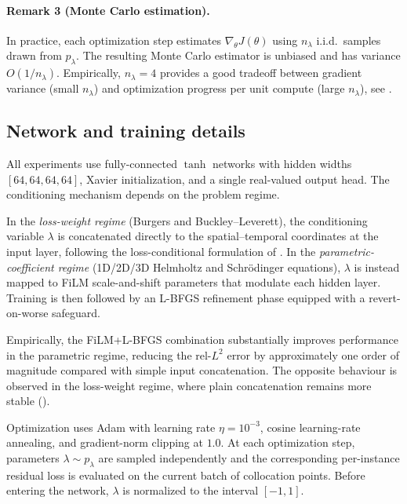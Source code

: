 \documentclass{article}
\theoremstyle{plain}
\theoremstyle{definition}
\theoremstyle{remark}
\begin{document}
\paragraph{Remark 3 (Monte Carlo estimation).}
\label{rem:sample}

In practice, each optimization step estimates
$\nabla_\theta J(\theta)$ using $n_\lambda$ i.i.d.\ samples drawn from
$p_\lambda$. The resulting Monte Carlo estimator is unbiased and has
variance $O(1/n_\lambda)$. Empirically,
$n_\lambda=4$ provides a good tradeoff between gradient variance
(small $n_\lambda$) and optimization progress per unit compute
(large $n_\lambda$), see .

\subsection{Network and training details}
\label{sec:training-details}

All experiments use fully-connected $\tanh$ networks with hidden
widths $[64,64,64,64]$, Xavier initialization, and a single
real-valued output head. The conditioning mechanism depends on the
problem regime.

In the \emph{loss-weight regime} (Burgers and Buckley--Leverett),
the conditioning variable $\lambda$ is concatenated directly to the
spatial--temporal coordinates at the input layer, following the
loss-conditional formulation of \citet{dosovitskiy2020}. In the
\emph{parametric-coefficient regime} (1D/2D/3D Helmholtz and
Schrödinger equations), $\lambda$ is instead mapped to FiLM
\citep{perez2018film} scale-and-shift parameters that modulate each
hidden layer. Training is then followed by an L-BFGS refinement phase
equipped with a revert-on-worse safeguard.

Empirically, the FiLM+L-BFGS combination substantially improves
performance in the parametric regime, reducing the rel-$L^2$ error by
approximately one order of magnitude compared with simple input
concatenation. The opposite behaviour is observed in the loss-weight
regime, where plain concatenation remains more stable
().

Optimization uses Adam with learning rate
$\eta = 10^{-3}$, cosine learning-rate annealing, and gradient-norm
clipping at $1.0$. At each optimization step, parameters
$\lambda \sim p_\lambda$ are sampled independently and the
corresponding per-instance residual loss is evaluated on the current
batch of collocation points. Before entering the network,
$\lambda$ is normalized to the interval $[-1,1]$.
\end{document}
